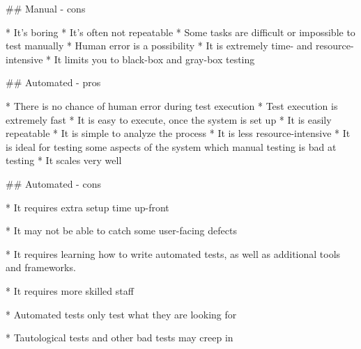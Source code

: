 ## Manual - cons

* It’s boring
* It’s often not repeatable
* Some tasks are difficult or impossible to test manually
* Human error is a possibility
* It is extremely time- and resource-intensive
* It limits you to black-box and gray-box testing

## Automated - pros

* There is no chance of human error during test
  execution
* Test execution is extremely fast
* It is easy to execute, once the system is set up
* It is easily repeatable
* It is simple to analyze the process
* It is less resource-intensive
* It is ideal for testing some aspects of the system which
  manual testing is bad at testing
* It scales very well


## Automated - cons

* It requires extra setup time up-front

* It may not be able to catch some user-facing defects

* It requires learning how to write automated tests, as
  well as additional tools and frameworks.

* It requires more skilled staff

* Automated tests only test what they are looking for

* Tautological tests and other bad tests may creep in

